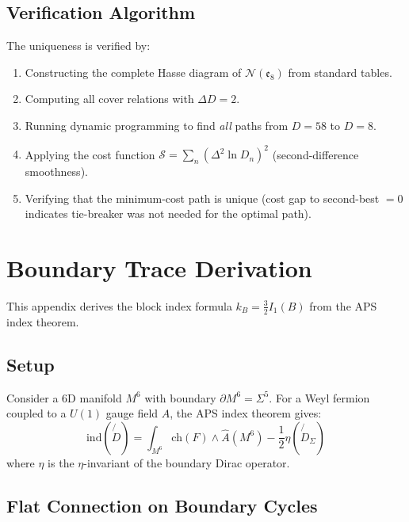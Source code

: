 \subsection{Verification Algorithm}

The uniqueness is verified by:
\begin{enumerate}[leftmargin=1.5em, topsep=2pt, itemsep=1pt]
    \item Constructing the complete Hasse diagram of $\mathcal{N}(\mathfrak{e}_8)$ 
        from standard tables.
    \item Computing all cover relations with $\Delta D = 2$.
    \item Running dynamic programming to find \emph{all} paths from $D = 58$ to $D = 8$.
    \item Applying the cost function $\mathcal{S} = \sum_n (\Delta^2 \ln D_n)^2$ 
        (second-difference smoothness).
    \item Verifying that the minimum-cost path is unique (cost gap to second-best $= 0$ 
        indicates tie-breaker was not needed for the optimal path).
\end{enumerate}

\section{Boundary Trace Derivation}
\label{app:boundary}

This appendix derives the block index formula $k_B = \frac{3}{2} I_1(B)$ from 
the APS index theorem.

\subsection{Setup}

Consider a 6D manifold $M^6$ with boundary $\partial M^6 = \Sigma^5$. For a 
Weyl fermion coupled to a $U(1)$ gauge field $A$, the APS index theorem gives:
\begin{equation}
    \text{ind}(\not{\!D}) = \int_{M^6} \text{ch}(F) \wedge \hat{A}(M^6) 
    - \frac{1}{2}\eta(\not{\!D}_\Sigma)
\end{equation}
where $\eta$ is the $\eta$-invariant of the boundary Dirac operator.

\subsection{Flat Connection on Boundary Cycles}

